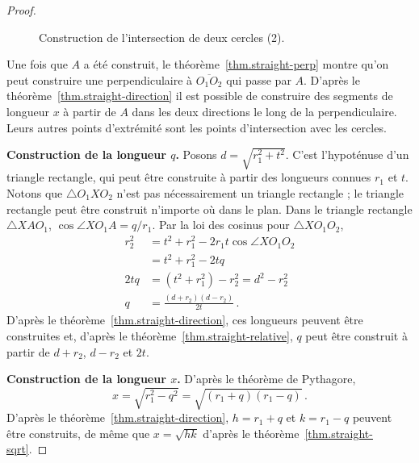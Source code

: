 \begin{proof}
\begin{figure}[htbp]
\centering

\caption{Construction de l'intersection de deux cercles (2).}\label{f.se-circle-circle2}
\end{figure}

Une fois que $A$ a été construit, le théorème~\ref{thm.straight-perp} montre qu'on peut construire une perpendiculaire à $\overline{O_1O_2}$ qui passe par $A$. D'après le théorème~\ref{thm.straight-direction} il est possible de construire des segments de longueur $x$ à partir de $A$ dans les deux directions le long de la perpendiculaire. Leurs autres points d'extrémité sont les points d'intersection avec les cercles.

\noindent\textbf{Construction de la longueur $q$.} Posons $d=\sqrt{r_1^2+t^2}$. C'est  l'hypoténuse d'un triangle rectangle, qui peut être construite à partir des longueurs connues $r_1$ et $t$. Notons que $\triangle O_1XO_2$ n'est pas nécessairement un triangle rectangle ; le triangle rectangle peut être construit n'importe où dans le plan. Dans le triangle rectangle $\triangle XAO_1$, $\cos\angle XO_1A=q/r_1$. Par la loi des cosinus  pour $\triangle XO_1O_2$,
\begin{align*}
r_2^2 &= t^2 + r_1^2 - 2r_1t\cos\angle XO_1O_2\\
&= t^2 + r_1^2 - 2tq\\
2tq &= (t^2+r_1^2) - r_2^2=d^2-r_2^2\\
q&=\frac{(d+r_2)(d-r_2)}{2t}\,.
\end{align*}
D'après le théorème~\ref{thm.straight-direction}, ces longueurs peuvent être construites et, d'après le théorème~\ref{thm.straight-relative}, $q$ peut être construit à partir de $d+r_2$, $d-r_2$ et $2t$.

\medskip

\noindent\textbf{Construction de la longueur $x$.} D'après le théorème de Pythagore,
\[
x=\sqrt{r_1^2-q^2}=\sqrt{(r_1+q)(r_1-q)}\,.
\]
D'après le théorème~\ref{thm.straight-direction}, $h =r_1+ q$ et $k= r_1 - q$ peuvent être construits, de même que $x=\sqrt{hk}$ d'après le théorème~\ref{thm.straight-sqrt}.
\end{proof}

